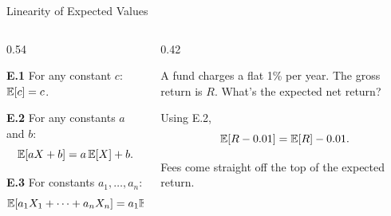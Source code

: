 \documentclass[9pt,english,aspectratio=169]{beamer}
\begin{document}
\begin{frame}{Linearity of Expected Values}

  \begin{columns}[T]
    \begin{column}{0.54\textwidth}
      \begin{methodbox}
        \textbf{E.1} \quad For any constant $c$: \quad $\mathbb{E}[c] = c$.
      \end{methodbox}
      \pause

      \vspace{0.5em}
      \begin{methodbox}
        \textbf{E.2} \quad For any constants $a$ and $b$:
        \[
          \mathbb{E}[aX + b] = a\,\mathbb{E}[X] + b.
        \]
      \end{methodbox}
      \pause

      \vspace{0.5em}
      \begin{methodbox}
        \textbf{E.3} \quad For constants $a_1, \ldots, a_n$:
        \[
          \mathbb{E}[a_1 X_1 + \cdots + a_n X_n]
            = a_1 \mathbb{E}[X_1] + \cdots + a_n \mathbb{E}[X_n].
        \]
      \end{methodbox}
    \end{column}
    \begin{column}{0.42\textwidth}
      \vspace{1.5em}
      \pause
      \begin{questionbox}
        A fund charges a flat 1\% per year. The gross return is
      $R$. What's the expected net return?
      \end{questionbox}
      \pause
      \begin{answerbox}
        Using E.2,
        \[
         \mathbb{E}[R - 0.01] = \mathbb{E}[R] - 0.01.
         \]
      \end{answerbox}
    
      \vspace{0.3em}
      Fees come straight off the top of the expected return.
    \end{column}
  \end{columns}

  \vspace{0.3em}

\end{frame}
\end{document}
